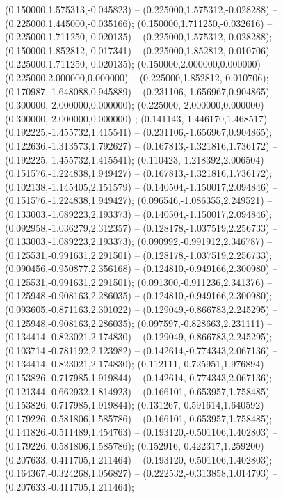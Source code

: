  (0.150000,1.575313,-0.045823) -- (0.225000,1.575312,-0.028288) -- (0.225000,1.445000,-0.035166);
 (0.150000,1.711250,-0.032616) -- (0.225000,1.711250,-0.020135) -- (0.225000,1.575312,-0.028288);
 (0.150000,1.852812,-0.017341) -- (0.225000,1.852812,-0.010706) -- (0.225000,1.711250,-0.020135);
 (0.150000,2.000000,0.000000) -- (0.225000,2.000000,0.000000) -- (0.225000,1.852812,-0.010706);
 (0.170987,-1.648088,0.945889) -- (0.231106,-1.656967,0.904865) -- (0.300000,-2.000000,0.000000);
 (0.225000,-2.000000,0.000000) -- (0.300000,-2.000000,0.000000) ;
 (0.141143,-1.446170,1.468517) -- (0.192225,-1.455732,1.415541) -- (0.231106,-1.656967,0.904865);
 (0.122636,-1.313573,1.792627) -- (0.167813,-1.321816,1.736172) -- (0.192225,-1.455732,1.415541);
 (0.110423,-1.218392,2.006504) -- (0.151576,-1.224838,1.949427) -- (0.167813,-1.321816,1.736172);
 (0.102138,-1.145405,2.151579) -- (0.140504,-1.150017,2.094846) -- (0.151576,-1.224838,1.949427);
 (0.096546,-1.086355,2.249521) -- (0.133003,-1.089223,2.193373) -- (0.140504,-1.150017,2.094846);
 (0.092958,-1.036279,2.312357) -- (0.128178,-1.037519,2.256733) -- (0.133003,-1.089223,2.193373);
 (0.090992,-0.991912,2.346787) -- (0.125531,-0.991631,2.291501) -- (0.128178,-1.037519,2.256733);
 (0.090456,-0.950877,2.356168) -- (0.124810,-0.949166,2.300980) -- (0.125531,-0.991631,2.291501);
 (0.091300,-0.911236,2.341376) -- (0.125948,-0.908163,2.286035) -- (0.124810,-0.949166,2.300980);
 (0.093605,-0.871163,2.301022) -- (0.129049,-0.866783,2.245295) -- (0.125948,-0.908163,2.286035);
 (0.097597,-0.828663,2.231111) -- (0.134414,-0.823021,2.174830) -- (0.129049,-0.866783,2.245295);
 (0.103714,-0.781192,2.123982) -- (0.142614,-0.774343,2.067136) -- (0.134414,-0.823021,2.174830);
 (0.112111,-0.725951,1.976894) -- (0.153826,-0.717985,1.919844) -- (0.142614,-0.774343,2.067136);
 (0.121344,-0.662932,1.814923) -- (0.166101,-0.653957,1.758485) -- (0.153826,-0.717985,1.919844);
 (0.131267,-0.591614,1.640592) -- (0.179226,-0.581806,1.585786) -- (0.166101,-0.653957,1.758485);
 (0.141826,-0.511489,1.454763) -- (0.193120,-0.501106,1.402803) -- (0.179226,-0.581806,1.585786);
 (0.152916,-0.422317,1.259200) -- (0.207633,-0.411705,1.211464) -- (0.193120,-0.501106,1.402803);
 (0.164367,-0.324268,1.056827) -- (0.222532,-0.313858,1.014793) -- (0.207633,-0.411705,1.211464);
